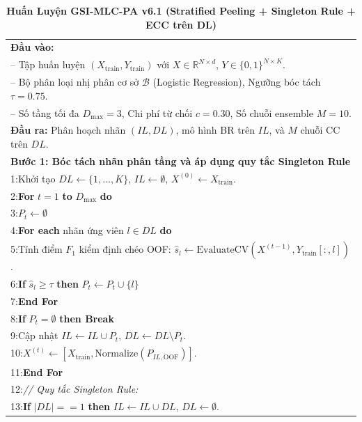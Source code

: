 \documentclass[11pt,a4paper]{article}
\begin{document}
\begin{table}[!htbp]
\centering
\small
\renewcommand{\arraystretch}{0.92}
\caption{\textbf{Huấn Luyện GSI-MLC-PA v6.1 (Stratified Peeling + Singleton Rule + ECC trên DL)}}\label{alg:v61_training}
\begin{tabular}{p{}}
\toprule
\textbf{Đầu vào:} \\
\quad -- Tập huấn luyện $(X_{\text{train}}, Y_{\text{train}})$ với $X \in \mathbb{R}^{N \times d}$, $Y \in \{0, 1\}^{N \times K}$. \\
\quad -- Bộ phân loại nhị phân cơ sở $\mathcal{B}$ (Logistic Regression), Ngưỡng bóc tách $\tau = 0.75$. \\
\quad -- Số tầng tối đa $D_{\max} = 3$, Chi phí từ chối $c = 0.30$, Số chuỗi ensemble $M = 10$. \\
\textbf{Đầu ra:} Phân hoạch nhãn $(IL, DL)$, mô hình BR trên $IL$, và $M$ chuỗi CC trên $DL$. \\
\midrule
\textbf{Bước 1: Bóc tách nhãn phân tầng và áp dụng quy tắc Singleton Rule} \\
1:\quad Khởi tạo $DL \leftarrow \{1, \dots, K\}$, $IL \leftarrow \emptyset$, $X^{(0)} \leftarrow X_{\text{train}}$. \\
2:\quad \textbf{For} $t = 1$ \textbf{to} $D_{\max}$ \textbf{do} \\
3:\quad\quad $P_t \leftarrow \emptyset$ \\
4:\quad\quad \textbf{For each} nhãn ứng viên $l \in DL$ \textbf{do} \\
5:\quad\quad\quad Tính điểm $F_1$ kiểm định chéo OOF: $\hat{s}_l \leftarrow \text{EvaluateCV}(X^{(t-1)}, Y_{\text{train}}[:, l])$. \\
6:\quad\quad\quad \textbf{If} $\hat{s}_l \ge \tau$ \textbf{then} $P_t \leftarrow P_t \cup \{l\}$ \\
7:\quad\quad \textbf{End For} \\
8:\quad\quad \textbf{If} $P_t = \emptyset$ \textbf{then Break} \\
9:\quad\quad Cập nhật $IL \leftarrow IL \cup P_t$, $DL \leftarrow DL \setminus P_t$. \\
10:\quad\quad $X^{(t)} \leftarrow [X_{\text{train}}, \text{Normalize}(P_{IL, \text{OOF}})]$. \\
11:\quad \textbf{End For} \\
12:\quad \textit{// Quy tắc Singleton Rule:} \\
13:\quad \textbf{If} $|DL| == 1$ \textbf{then} $IL \leftarrow IL \cup DL$, $DL \leftarrow \emptyset$. \\

\end{tabular}
\end{table}
\end{document}
